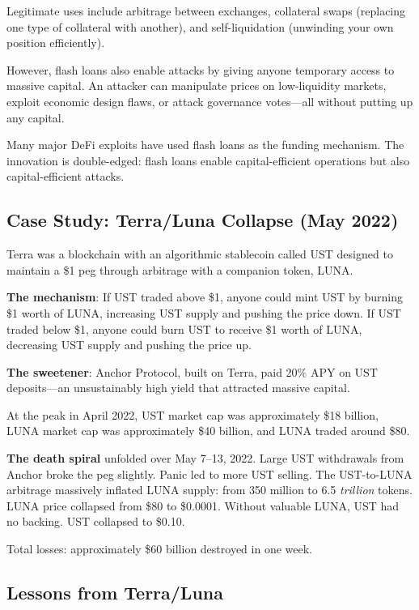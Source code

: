 \documentclass[11pt,a4paper]{article}
\begin{document}
Legitimate uses include arbitrage between exchanges, collateral swaps (replacing one type of collateral with another), and self-liquidation (unwinding your own position efficiently).

However, flash loans also enable attacks by giving anyone temporary access to massive capital. An attacker can manipulate prices on low-liquidity markets, exploit economic design flaws, or attack governance votes---all without putting up any capital.

Many major DeFi exploits have used flash loans as the funding mechanism. The innovation is double-edged: flash loans enable capital-efficient operations but also capital-efficient attacks.

\subsection{Case Study: Terra/Luna Collapse (May 2022)}

Terra was a blockchain with an algorithmic stablecoin called UST designed to maintain a \$1 peg through arbitrage with a companion token, LUNA.

\textbf{The mechanism}: If UST traded above \$1, anyone could mint UST by burning \$1 worth of LUNA, increasing UST supply and pushing the price down. If UST traded below \$1, anyone could burn UST to receive \$1 worth of LUNA, decreasing UST supply and pushing the price up.

\textbf{The sweetener}: Anchor Protocol, built on Terra, paid 20\% APY on UST deposits---an unsustainably high yield that attracted massive capital.

At the peak in April 2022, UST market cap was approximately \$18 billion, LUNA market cap was approximately \$40 billion, and LUNA traded around \$80.

\textbf{The death spiral} unfolded over May 7--13, 2022. Large UST withdrawals from Anchor broke the peg slightly. Panic led to more UST selling. The UST-to-LUNA arbitrage massively inflated LUNA supply: from 350 million to 6.5 \textit{trillion} tokens. LUNA price collapsed from \$80 to \$0.0001. Without valuable LUNA, UST had no backing. UST collapsed to \$0.10.

Total losses: approximately \$60 billion destroyed in one week.

\subsection{Lessons from Terra/Luna}
\end{document}
